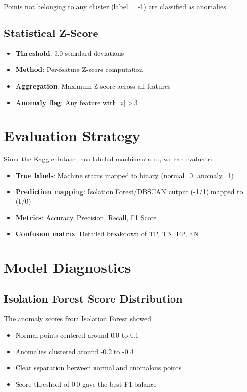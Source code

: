 \documentclass[12pt,a4paper]{report}
\begin{document}
Points not belonging to any cluster (label = -1) are classified as anomalies.

\subsection{Statistical Z-Score}

\begin{itemize}
    \item \textbf{Threshold}: 3.0 standard deviations
    \item \textbf{Method}: Per-feature Z-score computation
    \item \textbf{Aggregation}: Maximum Z-score across all features
    \item \textbf{Anomaly flag}: Any feature with $|z| > 3$
\end{itemize}

\section{Evaluation Strategy}

Since the Kaggle dataset has labeled machine states, we can evaluate:
\begin{itemize}
    \item \textbf{True labels}: Machine status mapped to binary (normal=0, anomaly=1)
    \item \textbf{Prediction mapping}: Isolation Forest/DBSCAN output (-1/1) mapped to (1/0)
    \item \textbf{Metrics}: Accuracy, Precision, Recall, F1 Score
    \item \textbf{Confusion matrix}: Detailed breakdown of TP, TN, FP, FN
\end{itemize}

\section{Model Diagnostics}

\subsection{Isolation Forest Score Distribution}

The anomaly scores from Isolation Forest showed:
\begin{itemize}
    \item Normal points centered around 0.0 to 0.1
    \item Anomalies clustered around -0.2 to -0.4
    \item Clear separation between normal and anomalous points
    \item Score threshold of 0.0 gave the best F1 balance
\end{itemize}
\end{document}
